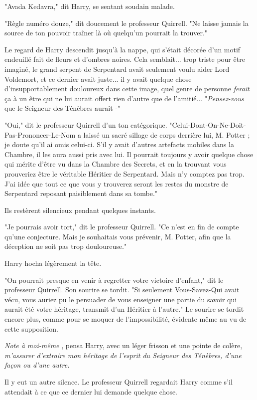 "Avada Kedavra," dit Harry, se sentant soudain malade.

"Règle numéro douze," dit doucement le professeur Quirrell. "Ne laisse jamais la source de ton pouvoir traîner là où quelqu'un pourrait la trouver."

Le regard de Harry descendit jusqu'à la nappe, qui s'était décorée d'un motif endeuillé fait de fleurs et d'ombres noires. Cela semblait... trop triste pour être imaginé, le grand serpent de Serpentard avait seulement voulu aider Lord Voldemort, et ce dernier avait juste... il y avait quelque chose d'insupportablement douloureux dans cette image, quel genre de personne \emph{ferait}  ça à un être qui ne lui aurait offert rien d'autre que de l'amitié... "\emph{Pensez-vous}  que le Seigneur des Ténèbres aurait -"

"Oui," dit le professeur Quirrell d'un ton catégorique. "Celui-Dont-On-Ne-Doit-Pas-Prononcer-Le-Nom a laissé un sacré sillage de corps derrière lui, M. Potter ; je doute qu'il ai omis celui-ci. S'il y avait d'autres artefacts mobiles dans la Chambre, il les aura aussi pris avec lui. Il pourrait toujours y avoir quelque chose qui mérite d'être vu dans la Chambre des Secrets, et en la trouvant vous prouveriez être le véritable Héritier de Serpentard. Mais n'y comptez pas trop. J'ai idée que tout ce que vous y trouverez seront les restes du monstre de Serpentard reposant paisiblement dans sa tombe."

Ils restèrent silencieux pendant quelques instants.

"Je pourrais avoir tort," dit le professeur Quirrell. "Ce n'est en fin de compte qu'une conjecture. Mais je souhaitais vous prévenir, M. Potter, afin que la déception ne soit pas trop douloureuse."

Harry hocha légèrement la tête.

"On pourrait presque en venir à regretter votre victoire d'enfant," dit le professeur Quirrell. Son sourire se tordit. "Si seulement Vous-Savez-Qui avait vécu, vous auriez pu le persuader de vous enseigner une partie du savoir qui aurait été votre héritage, transmit d'un Héritier à l'autre." Le sourire se tordit encore plus, comme pour se moquer de l'impossibilité, évidente même au vu de cette supposition.

\emph{Note à moi-même} , pensa Harry, avec un léger frisson et une pointe de colère, \emph{m'assurer d'extraire mon héritage de l'esprit du Seigneur des Ténèbres, d'une façon ou d'une autre.} 

Il y eut un autre silence. Le professeur Quirrell regardait Harry comme s'il attendait à ce que ce dernier lui demande quelque chose.

